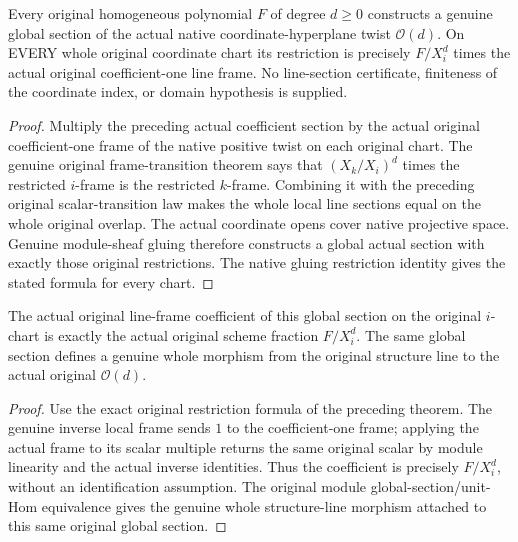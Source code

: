 \begin{theorem}
\label{thm:fc-original-homogeneous-form-section}
\leanok
{}
Every original homogeneous polynomial $F$ of degree $d\geq0$ constructs a
genuine global section of the actual native coordinate-hyperplane twist
$\mathcal O(d)$.  On EVERY whole original coordinate chart its restriction
is precisely $F/X_i^d$ times the actual original coefficient-one line frame.
No line-section certificate, finiteness of the coordinate index, or domain
hypothesis is supplied.
\end{theorem}
\begin{proof}
Multiply the preceding actual coefficient section by the actual original
coefficient-one frame of the native positive twist on each original chart.
The genuine original frame-transition theorem says that $(X_k/X_i)^d$
times the restricted $i$-frame is the restricted $k$-frame.  Combining it
with the preceding original scalar-transition law makes the whole local
line sections equal on the whole original overlap.  The actual coordinate
opens cover native projective space.  Genuine module-sheaf gluing therefore
constructs a global actual section with exactly those original restrictions.
The native gluing restriction identity gives the stated formula for every chart.
\end{proof}

\begin{lemma}
\label{lem:fc-original-homogeneous-form-frame-coefficient}
\leanok
{}
The actual original line-frame coefficient of this global section on the
original $i$-chart is exactly the actual original scheme fraction $F/X_i^d$.
The same global section defines a genuine whole morphism from the original
structure line to the actual original $\mathcal O(d)$.
\end{lemma}
\begin{proof}
Use the exact original restriction formula of the preceding theorem.
The genuine inverse local frame sends $1$ to the coefficient-one frame;
applying the actual frame to its scalar multiple returns the same original
scalar by module linearity and the actual inverse identities.  Thus the
coefficient is precisely $F/X_i^d$, without an identification assumption.
The original module global-section/unit-Hom equivalence gives the genuine
whole structure-line morphism attached to this same original global section.
\end{proof}
